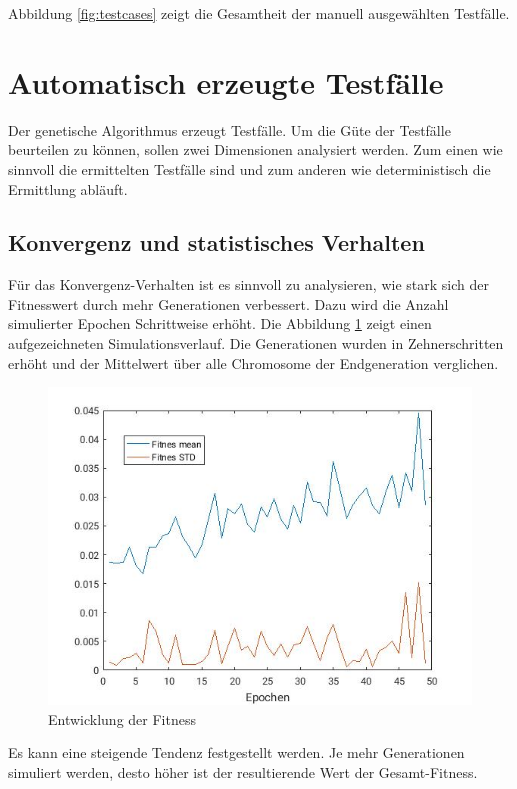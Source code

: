 \documentclass[12pt,a4paper]{article}
\begin{document}
Abbildung \ref{fig:testcases} zeigt die Gesamtheit der manuell ausgewählten Testfälle.

\section{Automatisch erzeugte Testfälle}
Der genetische Algorithmus erzeugt Testfälle. Um die Güte der Testfälle beurteilen zu können, sollen zwei Dimensionen analysiert werden. Zum einen wie sinnvoll die ermittelten Testfälle sind und zum anderen wie deterministisch die Ermittlung abläuft.

\subsection{Konvergenz und statistisches Verhalten}
Für das Konvergenz-Verhalten ist es sinnvoll zu analysieren, wie stark sich der Fitnesswert durch mehr Generationen verbessert.
Dazu wird die Anzahl simulierter Epochen Schrittweise erhöht. Die Abbildung \ref{fig:epochen} zeigt einen aufgezeichneten Simulationsverlauf. Die Generationen wurden in Zehnerschritten erhöht und der Mittelwert über alle Chromosome der Endgeneration verglichen.
\begin{figure}\centering
\includegraphics[width=.6\textwidth]{increasedEpochs.jpg}
\caption{Entwicklung der Fitness}
\label{fig:epochen}
\end{figure}
Es kann eine steigende Tendenz festgestellt werden. Je mehr Generationen simuliert werden, desto höher ist der resultierende Wert der Gesamt-Fitness.
\end{document}
